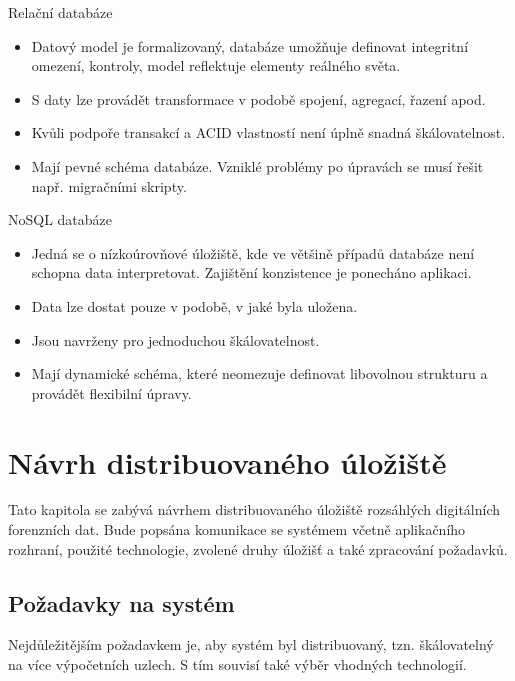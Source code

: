 \begin{multicols}{2}

Relační databáze

\begin{itemize}
    \item Datový model je formalizovaný, databáze umožňuje definovat integritní omezení, kontroly, model reflektuje elementy reálného světa.
    
    \item S daty lze provádět transformace v podobě spojení, agregací, řazení apod.
    
    \item Kvůli podpoře transakcí a ACID vlastností není úplně snadná škálovatelnost.
    
    \item Mají pevné schéma databáze. Vzniklé problémy po úpravách se musí řešit např. migračními skripty.
\end{itemize}

\columnbreak

NoSQL databáze

\begin{itemize}
    \item Jedná se o nízkoúrovňové úložiště, kde ve většině případů databáze není schopna data interpretovat. Zajištění konzistence je ponecháno aplikaci. 
    
    \item Data lze dostat pouze v podobě, v jaké byla uložena.
    
    \item Jsou navrženy pro jednoduchou škálovatelnost.
    
    \item Mají dynamické schéma, které neomezuje definovat libovolnou strukturu a provádět flexibilní úpravy.
\end{itemize}

\end{multicols}

\chapter{Návrh distribuovaného úložiště} \label{distrRepDesignChapter}
Tato kapitola se zabývá návrhem distribuovaného úložiště rozsáhlých digitálních forenzních dat. Bude popsána komunikace se systémem včetně aplikačního rozhraní, použité technologie, zvolené druhy úložišť a také zpracování požadavků.

\section{Požadavky na systém}
Nejdůležitějším požadavkem je, aby systém byl distribuovaný, tzn. škálovatelný na více výpočetních uzlech. S tím souvisí také výběr vhodných technologií.

